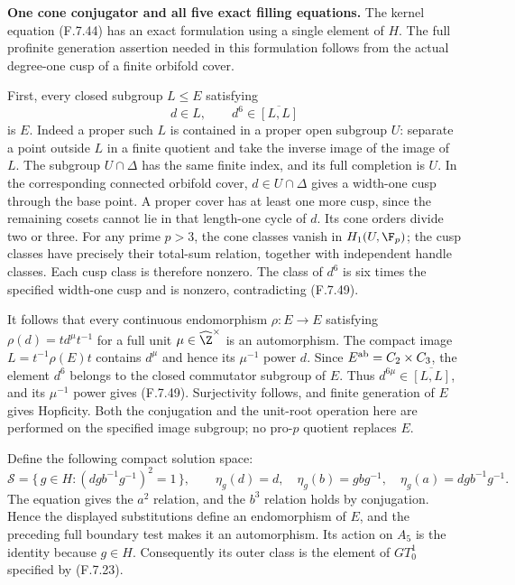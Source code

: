 \medskip\noindent\textbf{One cone conjugator and all five exact filling equations.}
The kernel equation (F.7.44) has an exact formulation
using a single element of $H$.  The full profinite
generation assertion needed in this formulation
follows from the actual degree-one cusp of a finite
orbifold cover.

First, every closed subgroup $L\leq E$ satisfying
\[
              d\in L,\qquad d^6\in\overline{[L,L]}
                                                               \tag{F.7.49}
\]
is $E$.  Indeed a proper such $L$ is contained in a
proper open subgroup $U$: separate a point outside
$L$ in a finite quotient and take the inverse image
of the image of $L$.  The subgroup
$U\cap\Delta$ has the same finite index, and its full
completion is $U$.  In the corresponding connected
orbifold cover, $d\in U\cap\Delta$ gives a width-one
cusp through the base point.  A proper cover has
at least one more cusp, since the remaining cosets
cannot lie in that length-one cycle of $d$.
Its cone orders divide two or three.
For any prime $p>3$, the cone classes vanish in
$H_1(U,\F_p)$; the cusp classes have precisely their
total-sum relation, together with independent
handle classes.  Each cusp class is therefore
nonzero.  The class of $d^6$ is six times the
specified width-one cusp and is nonzero, contradicting
(F.7.49).

It follows that every continuous endomorphism
$\rho:E\to E$ satisfying
$\rho(d)=t d^\mu t^{-1}$ for a full unit
$\mu\in\widehat\Z^\times$ is an automorphism.
The compact image $L=t^{-1}\rho(E)t$ contains
$d^\mu$ and hence its $\mu^{-1}$ power $d$.
Since $E^{\rm ab}=C_2\times C_3$, the element
$d^6$ belongs to the closed commutator subgroup
of $E$.  Thus $d^{6\mu}\in\overline{[L,L]}$,
and its $\mu^{-1}$ power gives (F.7.49).
Surjectivity follows, and finite generation of $E$
gives Hopficity.  Both the conjugation and the
unit-root operation here are performed on the
specified image subgroup; no pro-$p$ quotient
replaces $E$.

Define the following compact solution space:
\[
 \mathscr S=
 \{\,g\in H:(d g b^{-1}g^{-1})^2=1\,\},\qquad
 \eta_g(d)=d,\quad
 \eta_g(b)=g b g^{-1},\quad
 \eta_g(a)=d g b^{-1}g^{-1}.
                                                               \tag{F.7.50}
\]
The equation gives the $a^2$ relation, and the
$b^3$ relation holds by conjugation.  Hence the
displayed substitutions define an endomorphism
of $E$, and the preceding full boundary test makes
it an automorphism.  Its action on $A_5$ is the
identity because $g\in H$.  Consequently its outer
class is the element of $GT_0^1$ specified by
(F.7.23).

